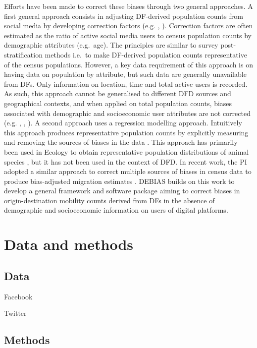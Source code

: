 \documentclass[]{rsos}%
\begin{document}
Efforts have been made to correct these biases through two general approaches. A first general approach consists in adjusting DF-derived population counts from social media by developing correction factors (e.g. \citep{yildiz17-twitter}, \citep{Hsiao24-bias}). Correction factors are often estimated as the ratio of active social media users to census population counts by demographic attributes (e.g.~age). The principles are similar to survey post-stratification methods i.e.~to make DF-derived population counts representative of the census populations. However, a key data requirement of this approach is on having data on population by attribute, but such data are generally unavailable from DFs. Only information on location, time and total active users is recorded. As such, this approach cannot be generalised to different DFD sources and geographical contexts, and when applied on total population counts, biases associated with demographic and socioeconomic user attributes are not corrected (e.g. \citep{rodriguez-carrion18-biases}, \citep{schlosser21-biases}, \citep{pak22-correcting-bias}). A second approach uses a regression modelling approach. Intuitively this approach produces representative population counts by explicitly measuring and removing the sources of biases in the data \citep{kramer-schadt13-bias-correction}. This approach has primarily been used in Ecology to obtain representative population distributions of animal species \citep{zizka21-sampbias}, but it has not been used in the context of DFD. In recent work, the PI adopted a similar approach to correct multiple sources of biases in census data to produce bias-adjusted migration estimates \citep{aparicio-castro23-bayesian}. DEBIAS builds on this work to develop a general framework and software package aiming to correct biases in origin-destination mobility counts derived from DFs in the absence of demographic and socioeconomic information on users of digital platforms.

\section{Data and methods}\label{data-and-methods}

\subsection{Data}\label{data}

Facebook

Twitter

\subsection{Methods}\label{methods}
\end{document}
